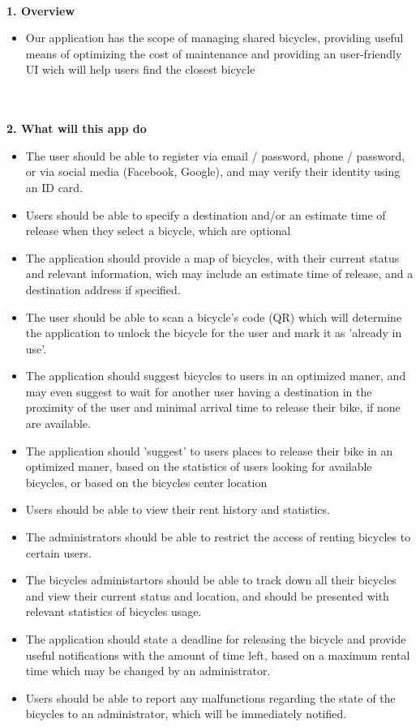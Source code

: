 \documentclass[a4paper]{article}
\begin{document}
\ \\
\textbf{1. Overview}
\begin{itemize}
\item Our application has the scope of managing shared bicycles, providing useful means of optimizing the cost of maintenance and providing an user-friendly UI wich will help users find the closest bicycle
\end{itemize}
\ \\ \ \\ 
\textbf{2. What will this app do}
\begin{itemize}
\item The user should be able to register via email / password, phone / password, or via social media (Facebook, Google), and may verify their identity using an ID card.
\item Users should be able to specify a destination and/or an estimate time of release when they select a bicycle, which are optional
\item The application should provide a map of bicycles, with their current status and relevant information, wich may include an estimate time of release, and a destination address if specified.
\item The user should be able to scan a bicycle's code (QR) which will determine the application to unlock the bicycle for the user and mark it as 'already in use'.
\item The application should suggest bicycles to users in an optimized maner, and may even suggest to wait for another user having a destination in the proximity of the user and minimal arrival time to release their bike, if none are available.
\item The application should 'suggest' to users places to release their bike in an optimized maner, based on the statistics of users looking for available bicycles, or based on the bicycles center location
\item Users should be able to view their rent history and statistics.
\item The administrators should be able to restrict the access of renting bicycles to certain users.
\item The bicycles administartors should be able to track down all their bicycles and view their current status and location, and should be presented with relevant statistics of bicycles usage.
\item The application should state a deadline for releasing the bicycle and provide useful notifications with the amount of time left, based on a maximum rental time which may be changed by an administrator.
\item Users should be able to report any malfunctions regarding the state of the bicycles to an administrator, which will be immediately notified.
\end{itemize}
\end{document}
